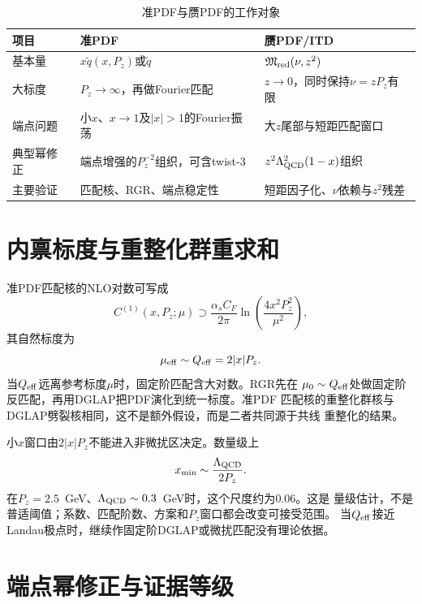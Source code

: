 \begin{table}[htbp]
  \centering
  \small
  \caption{准PDF与赝PDF的工作对象}
  \label{tab:b04-quasi-pseudo}
  \begin{tabularx}{\textwidth}{@{}lXX@{}}
    \toprule
    项目 & 准PDF & 赝PDF/ITD \\
    \midrule
    基本量 & $x\tilde q(x,P_z)$或$\tilde q$ & $\mathfrak M_{\rm red}(\nu,z^2)$ \\
    大标度 & $P_z\to\infty$，再做Fourier匹配 & $z\to0$，同时保持$\nu=zP_z$有限 \\
    端点问题 & 小$x$、$x\to1$及$|x|>1$的Fourier振荡 & 大$z$尾部与短距匹配窗口 \\
    典型幂修正 & 端点增强的$P_z^{-2}$组织，可含twist-3 & $z^2\Lambda_{\rm QCD}^2(1-x)$组织 \\
    主要验证 & 匹配核、RGR、端点稳定性 & 短距因子化、$\nu$依赖与$z^2$残差 \\
    \bottomrule
  \end{tabularx}
\end{table}

\section{内禀标度与重整化群重求和}

准PDF匹配核的NLO对数可写成
\begin{equation}
  C^{(1)}(x,P_z;\mu)
  \supset \frac{\alpha_sC_F}{2\pi}
  \ln\!\left(\frac{4x^2P_z^2}{\mu^2}\right),
  \label{eq:b04-matching-log}
\end{equation}
其自然标度为
\begin{equation}
  \mu_{\rm eff}\sim Q_{\rm eff}=2|x|P_z .
  \label{eq:b04-qeff}
\end{equation}
当$Q_{\rm eff}$远离参考标度$\mu$时，固定阶匹配含大对数。RGR先在
$\mu_0\sim Q_{\rm eff}$处做固定阶反匹配，再用DGLAP把PDF演化到统一标度。准PDF
匹配核的重整化群核与DGLAP劈裂核相同，这不是额外假设，而是二者共同源于共线
重整化的结果。

小$x$窗口由$2|x|P_z$不能进入非微扰区决定。数量级上
\begin{equation}
  x_{\min}\sim\frac{\Lambda_{\rm QCD}}{2P_z}.
  \label{eq:b04-xmin}
\end{equation}
在$P_z=2.5$~GeV、$\Lambda_{\rm QCD}\sim0.3$~GeV时，这个尺度约为$0.06$。这是
量级估计，不是普适阈值；系数、匹配阶数、方案和$P_z$窗口都会改变可接受范围。
当$Q_{\rm eff}$接近Landau极点时，继续作固定阶DGLAP或微扰匹配没有理论依据。

\section{端点幂修正与证据等级}


